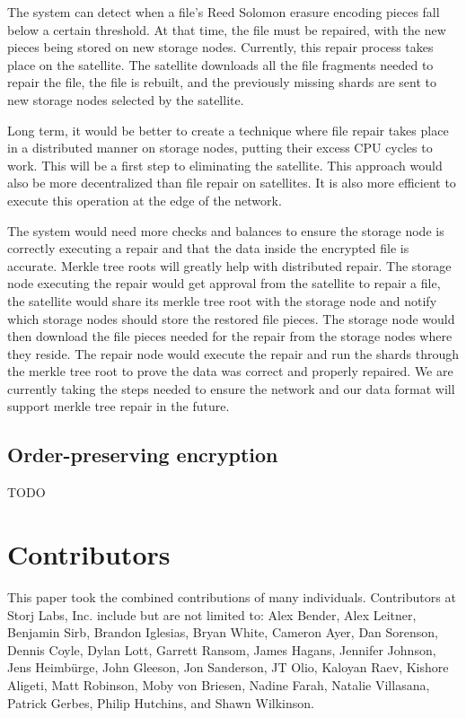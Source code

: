 \documentclass[11pt,fleqn,openany]{book}
\newcommand{\todo}[1]{{\color{red} TODO #1 }}
\begin{document}
The system can detect when a file's Reed Solomon erasure encoding pieces fall
below a certain threshold. At that time, the file must be repaired, with
the new pieces being stored on new storage nodes.
Currently, this
repair process takes place on the satellite. The satellite downloads all
the file fragments needed to repair the file, the file is rebuilt, and the
previously missing shards are sent to new storage nodes
selected by the satellite.

Long term, it would be better to create a technique where file repair takes
place in a distributed manner on storage nodes, putting their excess CPU
cycles
to work. This will be a first step to eliminating the satellite. This
approach would also be more decentralized than file repair on satellites. It
is also more efficient to execute this operation at the edge of the network.

The system would need more checks and balances to ensure the storage node is
correctly
executing a repair and that the data inside the encrypted file is accurate.
Merkle tree roots will greatly help with distributed repair. The storage
node
executing the repair would get approval from the satellite to repair a file,
the satellite would share its merkle tree root with the storage node and
notify
which storage nodes should store the restored file pieces. The storage node
would then
download the file pieces needed for the repair from the storage nodes where they
reside. The repair node would execute the repair and run the shards
through the merkle tree root to prove the data was correct and properly
repaired. We are currently taking the steps needed to ensure the network and our
data format will support merkle tree repair in the future.

\section{Order-preserving encryption}

\todo{}

\chapter{Contributors}

This paper took the combined contributions of many individuals. Contributors
at Storj Labs, Inc. include but are not limited to:
Alex Bender,
Alex Leitner,
Benjamin Sirb,
Brandon Iglesias,
Bryan White,
Cameron Ayer,
Dan Sorenson,
Dennis Coyle,
Dylan Lott,
Garrett Ransom,
James Hagans,
Jennifer Johnson,
Jens Heimbürge,
John Gleeson,
Jon Sanderson,
JT Olio,
Kaloyan Raev,
Kishore Aligeti,
Matt Robinson,
Moby von Briesen,
Nadine Farah,
Natalie Villasana,
Patrick Gerbes,
Philip Hutchins,
and Shawn Wilkinson.
\end{document}
